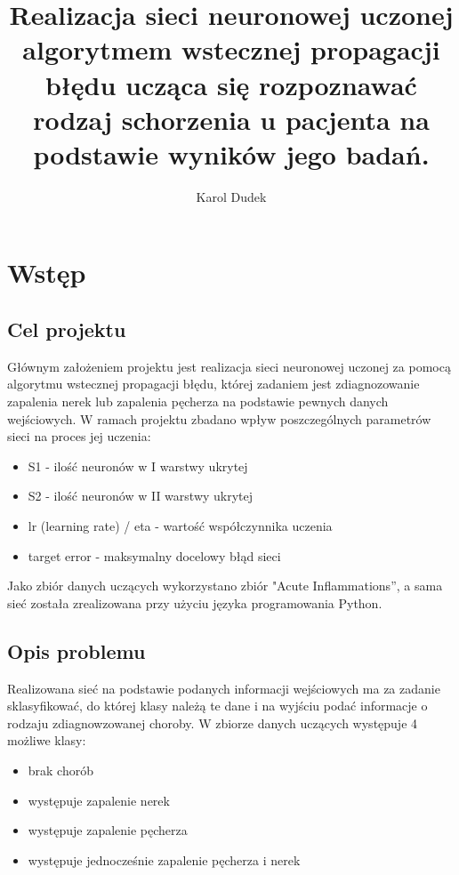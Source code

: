 \documentclass[12pt,twoside]{article}
\author{Karol Dudek}
\title{Realizacja sieci neuronowej uczonej algorytmem wstecznej propagacji błędu ucząca się rozpoznawać rodzaj schorzenia u pacjenta na podstawie wyników jego badań.}
\begin{document}
\maketitle

\blankpage

\tableofcontents

\clearpage
\blankpage

\section{Wstęp}
\subsection{Cel projektu}

Głównym założeniem projektu jest realizacja sieci neuronowej uczonej za pomocą algorytmu wstecznej propagacji błędu, której zadaniem jest zdiagnozowanie zapalenia nerek lub zapalenia pęcherza na podstawie pewnych danych wejściowych.
W ramach projektu zbadano wpływ poszczególnych parametrów sieci na proces jej uczenia:
\begin{itemize}
\item S1 - ilość neuronów w I warstwy ukrytej
\item S2 - ilość neuronów w II warstwy ukrytej
\item lr (learning rate) / eta - wartość współczynnika uczenia
\item target error - maksymalny docelowy błąd sieci 
\end{itemize}
Jako zbiór danych uczących wykorzystano zbiór "Acute Inflammations”, a sama sieć została zrealizowana przy użyciu języka programowania Python.
\newpage

\subsection{Opis problemu}
Realizowana sieć na podstawie podanych informacji wejściowych ma za zadanie sklasyfikować, do której klasy należą te dane i na wyjściu podać informacje o rodzaju zdiagnowzowanej choroby.
W zbiorze danych uczących występuje 4 możliwe klasy:
\begin{itemize}
	\item brak chorób
	\item występuje zapalenie nerek
	\item występuje zapalenie pęcherza 
	\item występuje jednocześnie zapalenie pęcherza i nerek
\end{itemize}
\end{document}
